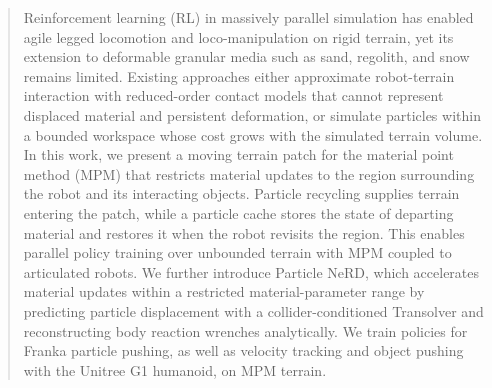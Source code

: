 \begin{abstract}
Reinforcement learning (RL) in massively parallel simulation has enabled agile legged locomotion and loco-manipulation on rigid terrain, yet its extension to deformable granular media such as sand, regolith, and snow remains limited.
Existing approaches either approximate robot-terrain interaction with reduced-order contact models that cannot represent displaced material and persistent deformation, or simulate particles within a bounded workspace whose cost grows with the simulated terrain volume.
In this work, we present a moving terrain patch for the material point method (MPM) that restricts material updates to the region surrounding the robot and its interacting objects.
Particle recycling supplies terrain entering the patch, while a particle cache stores the state of departing material and restores it when the robot revisits the region.
This enables parallel policy training over unbounded terrain with MPM coupled to articulated robots.
We further introduce Particle NeRD, which accelerates material updates within a restricted material-parameter range by predicting particle displacement with a collider-conditioned Transolver and reconstructing body reaction wrenches analytically.
We train policies for Franka particle pushing, as well as velocity tracking and object pushing with the Unitree G1 humanoid, on MPM terrain.
\end{abstract}
